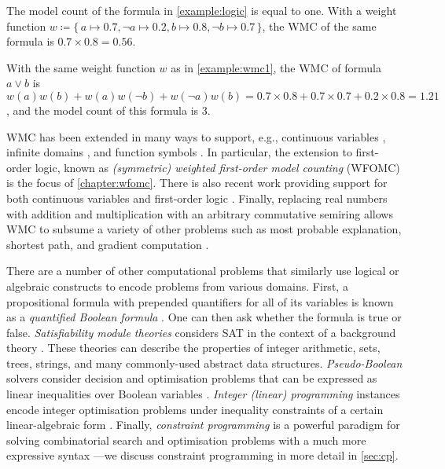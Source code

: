 \begin{example}\label{example:wmc1}
  The model count of the formula in \cref{example:logic} is equal to one. With a
  weight function
  $w \coloneqq \{\, a \mapsto 0.7, \neg a \mapsto 0.2, b \mapsto 0.8, \neg b \mapsto 0.7 \,\}$,
  the WMC of the same formula is $0.7 \times 0.8 = 0.56$.
\end{example}

\begin{example}
  With the same weight function $w$ as in \cref{example:wmc1}, the WMC of
  formula $a \lor b$ is
  $w(a)w(b) + w(a)w(\neg b) + w(\neg a)w(b) = 0.7 \times 0.8 + 0.7 \times 0.7 + 0.2 \times 0.8 = 1.21$,
  and the model count of this formula is 3.
\end{example}

WMC has been extended in many ways to support, e.g., continuous variables
\citep{DBLP:conf/ijcai/BellePB15}, infinite domains
\citep{DBLP:conf/aaai/Belle17}, and function symbols
\citep{DBLP:conf/uai/Belle17}. In particular, the extension to first-order
logic, known as \emph{(symmetric) weighted first-order model counting} (WFOMC)
\citep{DBLP:journals/cacm/GogateD16,DBLP:conf/ijcai/BroeckTMDR11} is the focus
of \cref{chapter:wfomc}. There is also recent work providing support for both
continuous variables and first-order logic \citep{DBLP:conf/uai/FeldsteinB21}.
Finally, replacing real numbers with addition and multiplication with an
arbitrary commutative semiring allows WMC to subsume a variety of other problems
such as most probable explanation, shortest path, and gradient computation
\citep{DBLP:journals/ijar/BelleR20,DBLP:journals/japll/KimmigBR17}.

There are a number of other computational problems that similarly use logical or
algebraic constructs to encode problems from various domains. First, a
propositional formula with prepended quantifiers for all of its variables is
known as a \emph{quantified Boolean formula} \citep{DBLP:series/faia/BuningB09}.
One can then ask whether the formula is true or false. \emph{Satisfiability
  module theories} considers SAT in the context of a background theory
\citep{DBLP:series/faia/BarrettSST09}. These theories can describe the
properties of integer arithmetic, sets, trees, strings, and many commonly-used
abstract data structures. \emph{Pseudo-Boolean} solvers consider decision and
optimisation problems that can be expressed as linear inequalities over Boolean
variables \citep{DBLP:series/faia/RousselM09}. \emph{Integer (linear)
  programming} instances encode integer optimisation problems under inequality
constraints of a certain linear-algebraic form \citep{wolsey2020integer}.
Finally, \emph{constraint programming} is a powerful paradigm for solving
combinatorial search and optimisation problems with a much more expressive
syntax \citep{DBLP:reference/fai/2}---we discuss constraint programming in more
detail in \cref{sec:cp}.

